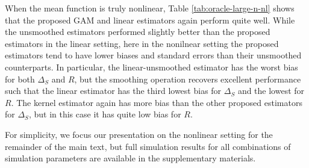 \documentclass[useAMS,usenatbib,referee]{biom}
\begin{document}
When the  mean function is truly nonlinear, Table \ref{tab:oracle-large-n-nl} shows that the proposed GAM and linear estimators again perform quite well. While the unsmoothed estimators performed slightly better than the proposed estimators in the linear setting, here in the nonilnear setting the proposed estimators tend to have lower biases and standard errors than their unsmoothed counterparts. In particular, the linear-unsmoothed estimator has the worst bias for both $\Delta_S$ and $R$, but the smoothing operation recovers excellent performance such that the linear estimator has the third lowest bias for $\Delta_S$ and the lowest for $R$. The kernel estimator again has more bias than the other proposed estimators for $\Delta_S$, but in this case it has quite low bias for $R$. 

For simplicity, we focus our presentation on the nonlinear setting for the remainder of the main text, but full simulation results for all combinations of simulation parameters are available in the supplementary materials. 
\end{document}
